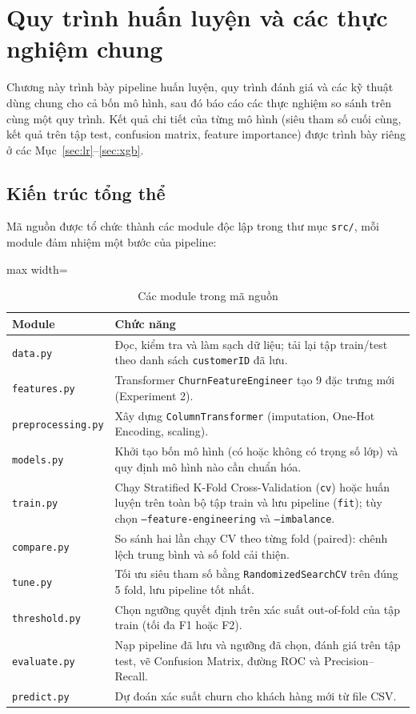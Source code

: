 \section{Quy trình huấn luyện và các thực nghiệm chung}\label{sec:method}

Chương này trình bày pipeline huấn luyện, quy trình đánh giá và các kỹ thuật dùng chung cho cả bốn mô hình, sau đó báo cáo các thực nghiệm so sánh trên cùng một quy trình. Kết quả chi tiết của từng mô hình (siêu tham số cuối cùng, kết quả trên tập test, confusion matrix, feature importance) được trình bày riêng ở các Mục~\ref{sec:lr}--\ref{sec:xgb}.

\subsection{Kiến trúc tổng thể}
Mã nguồn được tổ chức thành các module độc lập trong thư mục \texttt{src/}, mỗi module đảm nhiệm một bước của pipeline:

\begin{table}[H]
\centering
\begin{adjustbox}{max width=\textwidth}
\begin{tabular}{|l|p{11.5cm}|}
\hline
\textbf{Module} & \textbf{Chức năng} \\
\hline
\texttt{data.py} & Đọc, kiểm tra và làm sạch dữ liệu; tải lại tập train/test theo danh sách \texttt{customerID} đã lưu. \\
\hline
\texttt{features.py} & Transformer \texttt{ChurnFeatureEngineer} tạo 9 đặc trưng mới (Experiment 2). \\
\hline
\texttt{preprocessing.py} & Xây dựng \texttt{ColumnTransformer} (imputation, One-Hot Encoding, scaling). \\
\hline
\texttt{models.py} & Khởi tạo bốn mô hình (có hoặc không có trọng số lớp) và quy định mô hình nào cần chuẩn hóa. \\
\hline
\texttt{train.py} & Chạy Stratified K-Fold Cross-Validation (\texttt{cv}) hoặc huấn luyện trên toàn bộ tập train và lưu pipeline (\texttt{fit}); tùy chọn \texttt{--feature-engineering} và \texttt{--imbalance}. \\
\hline
\texttt{compare.py} & So sánh hai lần chạy CV theo từng fold (paired): chênh lệch trung bình và số fold cải thiện. \\
\hline
\texttt{tune.py} & Tối ưu siêu tham số bằng \texttt{RandomizedSearchCV} trên đúng 5 fold, lưu pipeline tốt nhất. \\
\hline
\texttt{threshold.py} & Chọn ngưỡng quyết định trên xác suất out-of-fold của tập train (tối đa F1 hoặc F2). \\
\hline
\texttt{evaluate.py} & Nạp pipeline đã lưu và ngưỡng đã chọn, đánh giá trên tập test, vẽ Confusion Matrix, đường ROC và Precision--Recall. \\
\hline
\texttt{predict.py} & Dự đoán xác suất churn cho khách hàng mới từ file CSV. \\
\hline
\end{tabular}
\end{adjustbox}
\caption{Các module trong mã nguồn}
\end{table}

